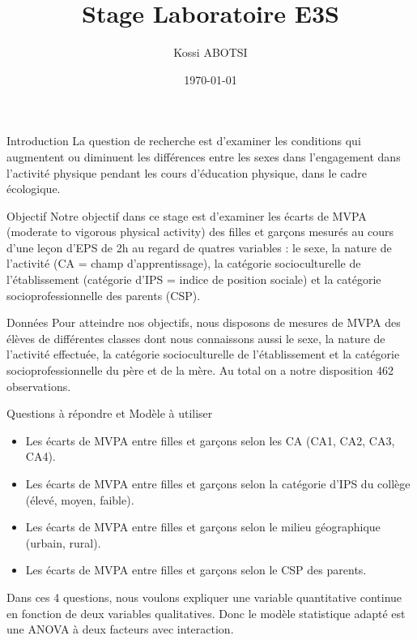 \documentclass{beamer}
\title{Stage Laboratoire E3S}
\author{Kossi ABOTSI}
\date{\today}
\begin{document}
	\begin{frame}[plain]
		\maketitle
	\end{frame}
	\begin{frame}{Introduction}
		La question de recherche est d'examiner les conditions qui augmentent ou diminuent les différences entre les sexes dans l'engagement dans l'activité physique pendant les cours d'éducation physique, dans le cadre écologique.
	\end{frame}
	\begin{frame}{Objectif}
		 Notre objectif dans ce stage est d'examiner les écarts de MVPA (moderate to vigorous physical activity) des filles et garçons mesurés au cours d'une leçon d'EPS de 2h au regard de quatres variables : le sexe, la nature de l'activité (CA = champ d'apprentissage), la catégorie socioculturelle de l'établissement (catégorie d'IPS = indice de position sociale) et la catégorie socioprofessionnelle des parents (CSP).
	\end{frame}
	
	\begin{frame}{Données}
		Pour atteindre nos objectifs, nous disposons de mesures de MVPA des élèves de différentes classes dont nous connaissons aussi le sexe, la nature de l'activité effectuée, la catégorie socioculturelle de l'établissement et la catégorie socioprofessionnelle du père et de la mère. Au total on a notre disposition 462 observations.\\
	\end{frame}
	\begin{frame}{Questions à répondre et Modèle à utiliser}
		\begin{itemize}
			\item Les écarts de MVPA entre filles et garçons selon les CA (CA1, CA2, CA3, CA4).
			\item Les écarts de MVPA entre filles et garçons selon la catégorie d’IPS du collège (élevé, moyen, faible).
			\item Les écarts de MVPA entre filles et garçons selon le milieu géographique (urbain, rural).
			\item Les écarts de MVPA entre filles et garçons selon le CSP des parents.
		\end{itemize}
		Dans ces 4 questions, nous voulons expliquer une variable quantitative continue en fonction de deux variables qualitatives. Donc le modèle statistique adapté est une ANOVA à deux facteurs avec interaction.
	\end{frame}
	
\end{document}
